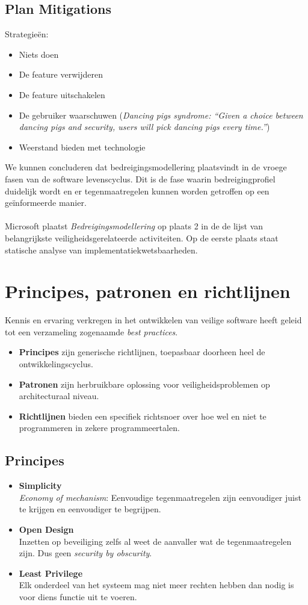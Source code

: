 \documentclass[../main.tex]{subfiles}
\begin{document}
\subsection{Plan Mitigations}
Strategie\"en:
\begin{itemize}
	\item Niets doen
	\item De feature verwijderen
	\item De feature uitschakelen
	\item De gebruiker waarschuwen (\textit{Dancing pigs syndrome: ``Given a choice between dancing pigs and security, users will pick dancing pigs every time.''})
	\item Weerstand bieden met technologie
\end{itemize}

We kunnen concluderen dat bedreigingsmodellering  plaatsvindt in de vroege fasen van de software levenscyclus. Dit is de fase waarin bedreigingprofiel duidelijk wordt en er tegenmaatregelen kunnen worden getroffen op een ge\"informeerde manier.
\\\\
Microsoft plaatst \textit{Bedreigingsmodellering} op plaats 2 in de de lijst van belangrijkste veiligheidsgerelateerde activiteiten. Op de eerste plaats staat statische analyse van implementatiekwetsbaarheden.

\section{Principes, patronen en richtlijnen}
Kennis en ervaring verkregen in het ontwikkelen van veilige software heeft geleid tot een verzameling zogenaamde \textit{best practices}.
\begin{itemize}
	\item \textbf{Principes} zijn generische richtlijnen, toepasbaar doorheen heel de ontwikkelingscyclus.
	\item \textbf{Patronen} zijn herbruikbare oplossing voor veiligheidsproblemen op architecturaal niveau.
	\item \textbf{Richtlijnen} bieden een specifiek richtsnoer over hoe wel en niet te programmeren in zekere programmeertalen.
\end{itemize}

\subsection{Principes}
\begin{itemize}
	\item \textbf{Simplicity} \\
	\textit{Economy of mechanism}: Eenvoudige tegenmaatregelen zijn eenvoudiger juist te krijgen en eenvoudiger te begrijpen.
	\item \textbf{Open Design} \\
	Inzetten op beveiliging zelfs al weet de aanvaller wat de tegenmaatregelen zijn. Dus geen  \textit{security by obscurity}.
	\item \textbf{Least Privilege} \\
	Elk onderdeel van het systeem mag niet meer rechten hebben dan nodig is voor diens functie uit te voeren.
\end{itemize}
\end{document}
